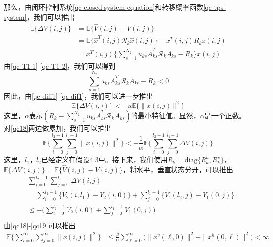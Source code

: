	那么，由闭环控制系统\eqref{qc-closed-system-equation}和转移概率函数\eqref{qc-tps-system}，我们可以推出
	\begin{equation}\label{qc-diff1}
		\begin{split}
			\mathbb{E}\{\varDelta V(i,j)\}&=\mathbb{E}\{\hat{V}(i,j)-V(i,j) \}\\
				&=\mathbb{E}\{\hat{x}^{T}(i,j)\mathcal{R}_{k}\hat{x}(i,j) \}- x^{T}(i,j)R_{k}x(i,j)\\
				&= x^{T}(i,j)\{\sum_{s=1}^{N_2}u_{ks} \bar{A}^{T}_{ks}\mathcal{R}_{k}\bar{A}_{ks} -R_{k} \}x(i,j)  
		\end{split}
	\end{equation}
	由\eqref{qc-T1-1}-\eqref{qc-T1-2}，我们可以得到
	\begin{equation}\label{qc-dif1}
		\sum_{s =1}^{N_2}u_{ks}\bar{A}^{T}_{ks}\mathcal{R}_{k}\bar{A}_{ks}-R_{k}<0
	\end{equation}
	因此，由\eqref{qc-diff1}-\eqref{qc-dif1}，我们可以进一步推出
	\begin{equation}\label{qc18}
		\mathbb{E}\{\varDelta V(i,j)\} < -\alpha \mathbb{E}\{\|x(i,j)\|^{2} \}
	\end{equation}
	这里，$\alpha$表示$(R_{k}-\sum_{s =1}^{N_2}u_{ks}\bar{A}^{T}_{ks}\mathcal{R}_{k}\bar{A}_{ks})$的最小特征值。显然，$\alpha$是一个正数。对\eqref{qc18}两边做累加，我们可以推出
	\begin{equation}
		\mathbb{E}\{ \sum_{i=0}^{l_2-1}\sum_{j=0}^{l_1-1}\|x(i,j)\|^{2} \}<-\frac{1}{\alpha}\mathbb{E}\{\sum_{i=0}^{l_2-1}\sum_{j=0}^{l_1-1}\varDelta V(i,j) \}
	\end{equation}
	这里，$l_1$，$l_2$已经定义在假设4.3中。接下来，我们使用$R_{k}=\mathrm{diag}\{R^{h}_{k},R^{v}_{k}\}$，$\mathbb{E}\{\varDelta V(i,j)\}=\mathbb{E}\{\hat{V}(i,j)-V(i,j) \}$，将水平，垂直状态分开，可以推出
	\begin{equation} \label{qc19}
	\begin{split}
	&\sum_{i=0}^{l_2-1}\sum_{j=0}^{l_1-1}  \varDelta V(i,j)\\&= \sum_{i=0}^{l_2-1}\big\{V_2(i,l_1) - V_2(i,0) \big\}+  \sum_{j=0}^{l_1-1}\big\{V_1(l_2,j) - V_1(0,j) \big\}\\
	&\leq -\big( \sum_{i=0}^{l_2-1}V_2(i,0) + \sum_{j=0}^{l_1-1}V_{1}(0,j)\big) \\
	\end{split}
	\end{equation} 
	由\eqref{qc18}-\eqref{qc19}可以推出
	\begin{equation}\label{qc20}
	\begin{split}
	\mathbb{E}\Big\{\sum_{i=0}^{\infty}\sum_{j=0}^{\infty}  \|x(i,j)\|^{2} \Big\} &\leq \frac{\beta}{\alpha} \sum_{\ell=0}^{\infty} \big(  \|x^{v}(\ell,0)\|^{2} + \|x^{h}(0,\ell)\|^{2} \big)<\infty
	\end{split}	
	\end{equation}
